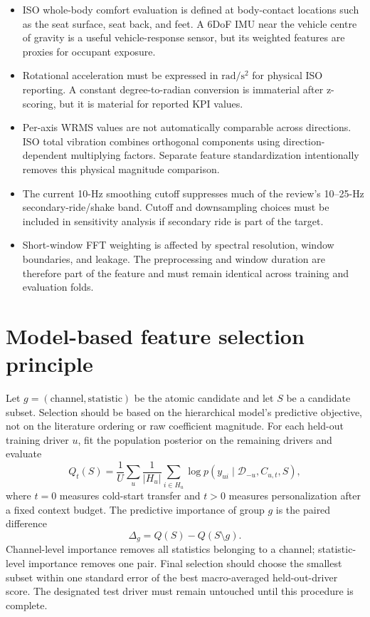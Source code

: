 \documentclass[letterpaper,journal]{IEEEtran}
\begin{document}
\begin{itemize}
\item ISO whole-body comfort evaluation is defined at body-contact locations such as the
seat surface, seat back, and feet. A 6DoF IMU near the vehicle centre of gravity is a useful
vehicle-response sensor, but its weighted features are proxies for occupant exposure.
\item Rotational acceleration must be expressed in $\mathrm{rad}/\mathrm{s}^2$ for physical
ISO reporting. A constant degree-to-radian conversion is immaterial after z-scoring, but it
is material for reported KPI values.
\item Per-axis WRMS values are not automatically comparable across directions. ISO total
vibration combines orthogonal components using direction-dependent multiplying factors.
Separate feature standardization intentionally removes this physical magnitude comparison.
\item The current 10-Hz smoothing cutoff suppresses much of the review's 10--25-Hz
secondary-ride/shake band. Cutoff and downsampling choices must be included in sensitivity
analysis if secondary ride is part of the target.
\item Short-window FFT weighting is affected by spectral resolution, window boundaries,
and leakage. The preprocessing and window duration are therefore part of the feature and
must remain identical across training and evaluation folds.
\end{itemize}

\section{Model-based feature selection principle}

Let $g=(\text{channel},\text{statistic})$ be the atomic candidate and let $S$ be a candidate
subset. Selection should be based on the hierarchical model's predictive objective, not on
the literature ordering or raw coefficient magnitude. For each held-out training driver $u$,
fit the population posterior on the remaining drivers and evaluate
\[
Q_t(S)=\frac{1}{U}\sum_u\frac{1}{|H_u|}
\sum_{i\in H_u}\log p(y_{ui}\mid\mathcal{D}_{-u},C_{u,t},S),
\]
where $t=0$ measures cold-start transfer and $t>0$ measures personalization after a fixed
context budget. The predictive importance of group $g$ is the paired difference
\[
\Delta_g=Q(S)-Q(S\setminus g).
\]
Channel-level importance removes all statistics belonging to a channel; statistic-level
importance removes one pair. Final selection should choose the smallest subset within one
standard error of the best macro-averaged held-out-driver score. The designated test driver
must remain untouched until this procedure is complete.
\end{document}
